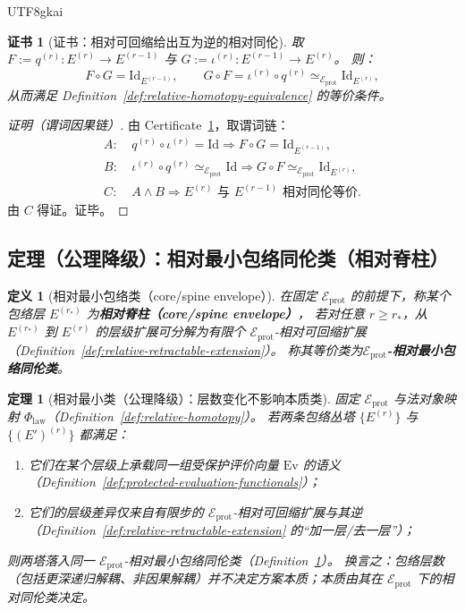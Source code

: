 \documentclass[12pt]{article}
\newtheorem{definition}{定义}[section]
\newtheorem{theorem}{定理}[section]
\newtheorem{certificate}{证书}[section]
\begin{document}
\begin{CJK*}{UTF8}{gkai}
\begin{certificate}[证书：相对可回缩给出互为逆的相对同伦]
\label{cert:relative-homotopy-depth-invariant}
取 $F:=q^{(r)}:E^{(r)}\to E^{(r-1)}$ 与 $G:=\iota^{(r)}:E^{(r-1)}\to E^{(r)}$。
则：
\[
F\circ G=\mathrm{Id}_{E^{(r-1)}},
\qquad
G\circ F=\iota^{(r)}\circ q^{(r)}\simeq_{\mathcal{E}_{\mathrm{prot}}}\mathrm{Id}_{E^{(r)}},
\]
从而满足 Definition~\ref{def:relative-homotopy-equivalence} 的等价条件。
\end{certificate}

\begin{proof}[证明（谓词因果链）]
由 Certificate~\ref{cert:relative-homotopy-depth-invariant}，取谓词链：
\[
\begin{aligned}
A:&\ q^{(r)}\circ \iota^{(r)}=\mathrm{Id}\Rightarrow F\circ G=\mathrm{Id}_{E^{(r-1)}},\\
B:&\ \iota^{(r)}\circ q^{(r)}\simeq_{\mathcal{E}_{\mathrm{prot}}}\mathrm{Id}\Rightarrow G\circ F\simeq_{\mathcal{E}
  _{\mathrm{prot}}}\mathrm{Id}_{E^{(r)}},\\
C:&\ A\wedge B\Rightarrow \text{$E^{(r)}$ 与 $E^{(r-1)}$ 相对同伦等价}.
\end{aligned}
\]
由 $C$ 得证。证毕。
\end{proof}

\subsection{定理（公理降级）：相对最小包络同伦类（相对脊柱）}

\begin{definition}[相对最小包络类（core/spine envelope）]
\label{def:relative-minimal-envelope-class}
在固定 $\mathcal{E}_{\mathrm{prot}}$ 的前提下，称某个包络层 $E^{(r_\ast)}$ 为\textbf{相对脊柱（core/spine envelope）}，
若对任意 $r\ge r_\ast$，从 $E^{(r_\ast)}$ 到 $E^{(r)}$ 的层级扩展可分解为有限个 $\mathcal{E}_{\mathrm{prot}}$-相对可回缩扩展（Definition~\ref{def:relative-retractable-extension}）。
称其等价类为\textbf{$\mathcal{E}_{\mathrm{prot}}$-相对最小包络同伦类}。
\end{definition}

\begin{theorem}[相对最小类（公理降级）：层数变化不影响本质类]
\label{thm:relative-minimal-envelope-class}
固定 $\mathcal{E}_{\mathrm{prot}}$ 与法对象映射 $\Phi_{\mathrm{law}}$（Definition~\ref{def:relative-homotopy}）。
若两条包络丛塔 $\{E^{(r)}\}$ 与 $\{(E')^{(r)}\}$ 都满足：
\begin{enumerate}
  \item 它们在某个层级上承载同一组受保护评价向量 $\mathrm{Ev}$ 的语义（Definition~\ref{def:protected-evaluation-functionals}）；
  \item 它们的层级差异仅来自有限步的 $\mathcal{E}_{\mathrm{prot}}$-相对可回缩扩展与其逆（Definition~\ref{def:relative-retractable-extension}
    的“加一层/去一层”）；
\end{enumerate}
则两塔落入同一 $\mathcal{E}_{\mathrm{prot}}$-相对最小包络同伦类（Definition~\ref{def:relative-minimal-envelope-class}）。
换言之：包络层数（包括更深递归解耦、非因果解耦）并不决定方案本质；本质由其在 $\mathcal{E}_{\mathrm{prot}}$ 下的相对同伦类决定。
\end{theorem}


\end{CJK*}
\end{document}
